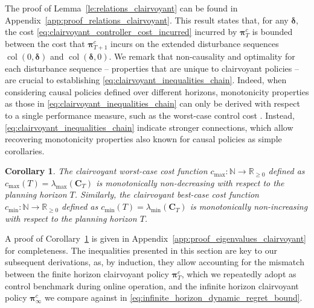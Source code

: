 \documentclass[conference]{IEEEtran}
\newtheorem{corollary}{Corollary}
\begin{document}
The proof of Lemma~\ref{le:relations_clairvoyant} can be found in Appendix~\ref{app:proof_relations_clairvoyant}. This result states that, for any $\bm{\delta}$, the cost \eqref{eq:clairvoyant_controller_cost_incurred} incurred by $\bm{\pi}_T^c$ is bounded between the cost that $\bm{\pi}_{T+1}^c$ incurs on the extended disturbance sequences $\operatorname{col}(0, \bm{\delta})$ and $\operatorname{col}(\bm{\delta}, 0)$. We remark that non-causality and optimality for each disturbance sequence – properties that are unique to clairvoyant policies –  are crucial to establishing \eqref{eq:clairvoyant_inequalities_chain}.
Indeed, when considering causal policies defined over different horizons, monotonicity properties as those in \eqref{eq:clairvoyant_inequalities_chain} can only be derived with respect to a single performance measure, such as the worst-case control cost \cite{goulart2009control}. Instead, \eqref{eq:clairvoyant_inequalities_chain} indicate stronger connections, which allow recovering monotonicity properties also known for causal policies as simple corollaries.

\begin{corollary}
    \label{cor:eigenvalues_clairvoyant}
    The clairvoyant worst-case cost function $c_{\operatorname{max}} : \mathbb{N} \to \mathbb{R}_{\geq 0}$ defined as $c_{\operatorname{max}}(T) = \lambda_{\operatorname{max}}(\mathbf{C}_T)$ is monotonically non-decreasing with respect to the planning horizon $T$. Similarly, the clairvoyant best-case cost function $c_{\operatorname{min}} : \mathbb{N} \to \mathbb{R}_{\geq 0}$ defined as $c_{\operatorname{min}}(T) = \lambda_{\operatorname{min}}(\mathbf{C}_T)$ is monotonically non-increasing with respect to the planning horizon $T$.
\end{corollary}

A proof of Corollary~\ref{cor:eigenvalues_clairvoyant} is given in Appendix~\ref{app:proof_eigenvalues_clairvoyant} for completeness. The inequalities presented in this section are key to our subsequent derivations, as, by induction, they allow accounting for the mismatch between the finite horizon clairvoyant policy $\bm{\pi}^c_T$, which we repeatedly adopt as control benchmark during online operation, and the infinite horizon clairvoyant policy $\bm{\pi}_\infty^c$ we compare against in \eqref{eq:infinite_horizon_dynamic_regret_bound}.
\end{document}
